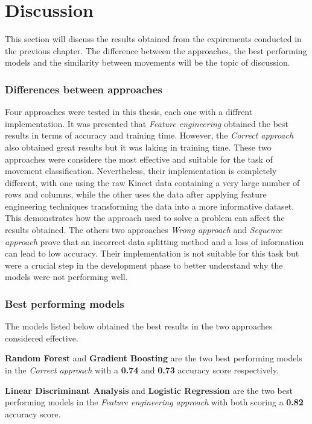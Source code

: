 \newpage
            
\section{Discussion}
        
        This section will discuss the results obtained from the expirements conducted in the previous chapter. The difference between the approaches, the best performing models and the similarity between movements will be the topic of discussion. 

        \subsubsection{Differences between approaches}
            Four approaches were tested in this thesis, each one with a diffrent implementation. It was presented that \textit{Feature engineering} obtained the best results in terms of accuracy and training time. However, the \textit{Correct approach} also obtained great results but it was laking in training time. These two approaches were considere the most effective and suitable for the task of movement classification. Nevertheless, their implementation is completely different, with one using the raw Kinect data containing a very large number of rows and columns, while the other uses the data after applying feature engineering techniques transforming the data into a more informative dataset. This demonstrates how the approach used to solve a problem can affect the results obtained. 
            The others two approaches \textit{Wrong approach} and \textit{Sequence approach}
            prove that an incorrect data splitting method and a loss of information can lead to low accuracy. Their implementation is not suitable for this task but were a crucial step in the development phase to better understand why the models were not performing well. 

        \subsubsection{Best performing models}
            The models listed below obtained the best results in the two approaches considered effective. 

            \begin{boxlabel}
                \item \textbf{Random Forest} and \textbf{Gradient Boosting} are the two best performing models in the \textit{Correct approach} with a \textbf{0.74} and \textbf{0.73} accuracy score respectively.
                \item \textbf{Linear Discriminant Analysis} and \textbf{Logistic Regression} are the two best performing models in the \textit{Feature engineering approach} with both scoring a \textbf{0.82} accuracy score.
            \end{boxlabel}

